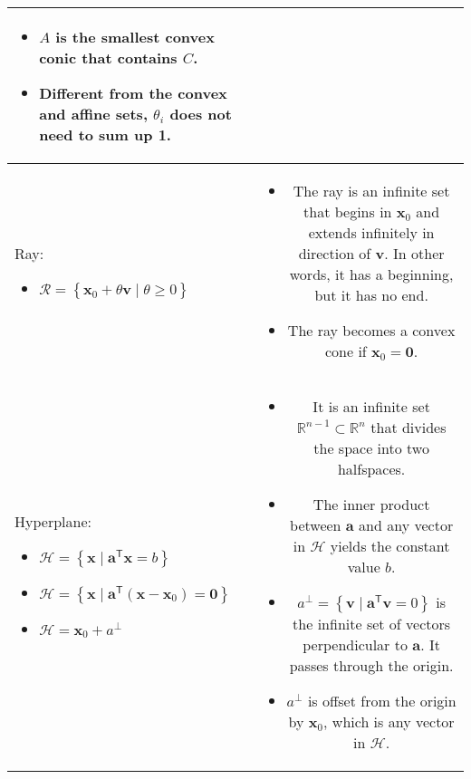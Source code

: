 \documentclass{article}
\newcommand{\trans}{\mathsf{T}}
\begin{document}
\begin{table}[ht!]
\begin{tabularx}{\textwidth}{|A|C|}
\begin{itemize}[leftmargin=*]
    \item $A$ is the smallest convex conic that contains $C$.
    \item Different from the convex and affine sets, \(\theta_i\) does not need to sum up 1.
\end{itemize}\\
\hline
Ray:
\begin{itemize}[leftmargin=*]
    \item \(\mathcal{R} = \left\{ \mathbf{x}_0 + \theta \mathbf{v} \mid \theta \geq 0 \right\}\)
\end{itemize} & \vspace{-3.5ex} \begin{itemize}[leftmargin=*]
    \item The ray is an infinite set that begins in \(\mathbf{x}_0\) and extends infinitely in direction of \(\mathbf{v}\). In other words, it has a beginning, but it has no end.
    \item The ray becomes a convex cone if \(\mathbf{x}_0 = \mathbf{0}.\)
\end{itemize} \\
\hline
Hyperplane:
\begin{itemize}[leftmargin=*]
    \item \( \mathcal{H} = \left\{ \mathbf{x} \mid \mathbf{a}^\trans \mathbf{x} = b \right\}\)
    \item \(\mathcal{H} = \left\{ \mathbf{x} \mid \mathbf{a}^\trans (\mathbf{x} - \mathbf{x}_{0}) = \mathbf{0} \right\}\)
    \item \(\mathcal{H} = \mathbf{x}_0 + a^{\perp} \)
\end{itemize} & \vspace{-3.5ex}
\begin{itemize}[leftmargin=*]
    \item It is an infinite set \(\mathbb{R}^{n-1} \subset \mathbb{R}^{n}\) that divides the space into two halfspaces.
    \item The inner product between \(\mathbf{a}\) and any vector in \(\mathcal{H}\) yields the constant value \(b\).
    \item \(a^{\perp} = \left\{ \mathbf{v} \mid \mathbf{a}^\trans \mathbf{v} = 0 \right\}\) is the infinite set of vectors perpendicular to \(\mathbf{a}\). It passes through the origin.
    \item \(a^{\perp}\) is offset from the origin by \(\mathbf{x}_0\), which is any vector in \(\mathcal{H}\).
\end{itemize} \\

\end{tabularx}
\end{table}
\end{document}
